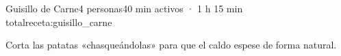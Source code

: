 \begin{recetaConImagen}{Guisillo de Carne}{4 personas}{40 min activos · 1 h 15 min total}{receta:guisillo_carne}
    \vspace{1em}
    \begin{tcolorbox}[colback=orange!5, colframe=orange!50, title=Sugerencia, size=small]
        Corta las patatas «chasqueándolas» para que el caldo espese de forma natural.
    \end{tcolorbox}
\end{recetaConImagen}
